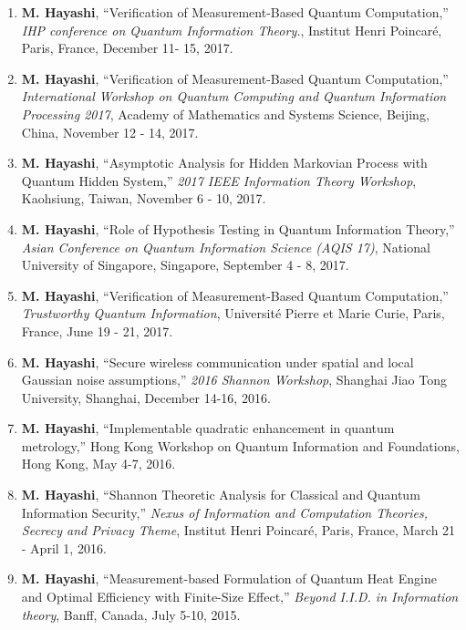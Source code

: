\documentclass[a4paper,12pt,oneside]{article}
\begin{document}
\begin{enumerate}
\item 
\textbf{M. Hayashi}, ``Verification of Measurement-Based Quantum Computation,'' 
{\em IHP conference on Quantum Information Theory.}, 
Institut Henri Poincar\'{e},
Paris, France, December 11- 15, 2017.

\item 
\textbf{M. Hayashi}, ``Verification of Measurement-Based Quantum Computation,'' 
{\em International Workshop on Quantum Computing and Quantum Information Processing 2017}, 
Academy of Mathematics and Systems Science, Beijing, China, November 12 - 14, 2017.

\item 
\textbf{M. Hayashi}, ``Asymptotic Analysis for Hidden Markovian Process with Quantum Hidden System,'' 
{\em 2017 IEEE Information Theory Workshop}, 
Kaohsiung, Taiwan, November 6 - 10, 2017.

\item 
\textbf{M. Hayashi}, ``Role of Hypothesis Testing in Quantum Information Theory,'' 
{\em Asian Conference on Quantum Information Science (AQIS 17)}, 
National University of Singapore, Singapore, September 4 - 8, 2017.


\item 
\textbf{M. Hayashi}, ``Verification of Measurement-Based Quantum Computation,'' 
{\em Trustworthy Quantum Information}, 
Universit\'{e} Pierre et Marie Curie, Paris, France, June 19 - 21, 2017.

\item 
\textbf{M. Hayashi}, 
``Secure wireless communication under spatial and local Gaussian noise assumptions,'' 
{\em 2016 Shannon Workshop}, Shanghai Jiao Tong University, Shanghai, December 14-16, 2016.


\item 
\textbf{M. Hayashi}, ``Implementable quadratic enhancement in quantum metrology,'' 
Hong Kong Workshop on Quantum Information and Foundations, Hong Kong, May 4-7, 2016.


\item 
\textbf{M. Hayashi}, ``Shannon Theoretic Analysis for Classical and Quantum Information Security,'' 
{\em Nexus of Information and Computation Theories, Secrecy and Privacy Theme}, 
Institut Henri Poincar\'{e}, Paris, France, March 21 - April 1, 2016.



\item 
\textbf{M. Hayashi}, ``Measurement-based Formulation of Quantum Heat Engine and Optimal Efficiency with Finite-Size Effect,'' 
{\em Beyond I.I.D. in Information theory}, Banff, Canada, July 5-10, 2015.


\end{enumerate}
\end{document}
